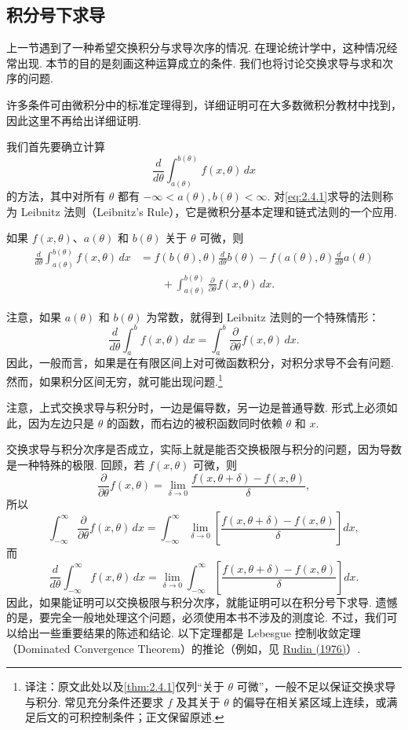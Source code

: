 \subsection{积分号下求导}\label{sec:2.4}
上一节遇到了一种希望交换积分与求导次序的情况. 在理论统计学中，这种情况经常出现. 本节的目的是刻画这种运算成立的条件. 我们也将讨论交换求导与求和次序的问题.

许多条件可由微积分中的标准定理得到，详细证明可在大多数微积分教材中找到，因此这里不再给出详细证明.

我们首先要确立计算
\begin{equation}\label{eq:2.4.1}
\frac d{d\theta}\int_{a(\theta)}^{b(\theta)}f(x,\theta)\,dx
\end{equation}
的方法，其中对所有 $\theta$ 都有 $-\infty<a(\theta),b(\theta)<\infty$. 对\eqref{eq:2.4.1}求导的法则称为 Leibnitz 法则（Leibnitz's Rule），它是微积分基本定理和链式法则的一个应用.
\begin{theorem}[Leibnitz 法则]\label{thm:2.4.1}
如果 $f(x,\theta)$、$a(\theta)$ 和 $b(\theta)$ 关于 $\theta$ 可微，则
$$\begin{aligned}
\frac d{d\theta}\int_{a(\theta)}^{b(\theta)}f(x,\theta)\,dx
&=f(b(\theta),\theta)\frac d{d\theta}b(\theta)
-f(a(\theta),\theta)\frac d{d\theta}a(\theta)\\
&\qquad+\int_{a(\theta)}^{b(\theta)}\frac\partial{\partial\theta}f(x,\theta)\,dx.
\end{aligned}$$
\end{theorem}
注意，如果 $a(\theta)$ 和 $b(\theta)$ 为常数，就得到 Leibnitz 法则的一个特殊情形：
$$\frac d{d\theta}\int_a^b f(x,\theta)\,dx
=\int_a^b\frac\partial{\partial\theta}f(x,\theta)\,dx.$$
因此，一般而言，如果是在有限区间上对可微函数积分，对积分求导不会有问题. 然而，如果积分区间无穷，就可能出现问题.\footnote{译注：原文此处以及\autoref{thm:2.4.1}仅列“关于 $\theta$ 可微”，一般不足以保证交换求导与积分. 常见充分条件还要求 $f$ 及其关于 $\theta$ 的偏导在相关紧区域上连续，或满足后文的可积控制条件；正文保留原述.}

注意，上式交换求导与积分时，一边是偏导数，另一边是普通导数. 形式上必须如此，因为左边只是 $\theta$ 的函数，而右边的被积函数同时依赖 $\theta$ 和 $x$.

交换求导与积分次序是否成立，实际上就是能否交换极限与积分的问题，因为导数是一种特殊的极限. 回顾，若 $f(x,\theta)$ 可微，则
$$\frac\partial{\partial\theta}f(x,\theta)
=\lim_{\delta\to0}\frac{f(x,\theta+\delta)-f(x,\theta)}\delta,$$
所以
$$\int_{-\infty}^\infty\frac\partial{\partial\theta}f(x,\theta)\,dx
=\int_{-\infty}^\infty\lim_{\delta\to0}\left[\frac{f(x,\theta+\delta)-f(x,\theta)}\delta\right]dx,$$
而
$$\frac d{d\theta}\int_{-\infty}^\infty f(x,\theta)\,dx
=\lim_{\delta\to0}\int_{-\infty}^\infty\left[\frac{f(x,\theta+\delta)-f(x,\theta)}\delta\right]dx.$$
因此，如果能证明可以交换极限与积分次序，就能证明可以在积分号下求导. 遗憾的是，要完全一般地处理这个问题，必须使用本书不涉及的测度论. 不过，我们可以给出一些重要结果的陈述和结论. 以下定理都是 Lebesgue 控制收敛定理（Dominated Convergence Theorem）的推论（例如，见 \hyperref[bib:source267]{Rudin (1976)}）.

